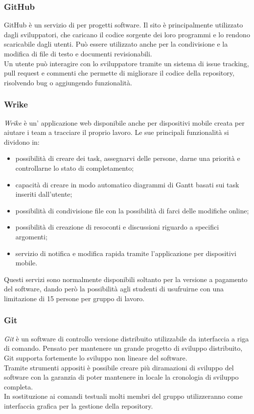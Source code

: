 \documentclass[../NormediProgetto.tex]{subfiles}
\begin{document}
	\subsubsection{GitHub}
	
	GitHub è un servizio di  per progetti software. 
	Il sito è principalmente utilizzato dagli sviluppatori, che caricano il codice sorgente dei loro programmi e lo rendono scaricabile dagli utenti. Può essere utilizzato anche per la condivisione e la modifica di file di testo e documenti revisionabili.
	\\ \noindent Un utente può interagire con lo sviluppatore tramite un sistema di issue tracking, pull request e commenti che permette di migliorare il codice della repository, risolvendo bug o aggiungendo funzionalità.

	\subsubsection{Wrike}

	\textit{Wrike} è un' applicazione web disponibile anche per dispositivi mobile creata per aiutare i team a tracciare il proprio lavoro. Le sue principali funzionalità si dividono in:
	\begin{itemize}
		\item possibilità di creare dei task, assegnarvi delle persone, darne una priorità e controllarne lo stato di completamento;
		\item capacità di creare in modo automatico diagrammi di Gantt basati sui task inseriti dall'utente;
		\item possibilità di condivisione file con la possibilità di farci delle modifiche online;
		\item possibilità di creazione di resoconti e discussioni riguardo a specifici argomenti;
		\item servizio di notifica e modifica rapida tramite l'applicazione per dispositivi mobile.
	\end{itemize}
	Questi servizi sono normalmente disponibili soltanto per la versione a pagamento del software, dando però la possibilità agli studenti di usufruirne con una limitazione di 15 persone per gruppo di lavoro.

	\subsubsection{Git}

	\textit{Git} è un software di controllo versione distribuito utilizzabile da interfaccia a riga di comando. Pensato per mantenere un grande progetto di sviluppo distribuito, Git supporta fortemente lo sviluppo non lineare del software.
	\\ \noindent Tramite strumenti appositi è possibile creare più diramazioni di sviluppo del software con la garanzia di poter mantenere in locale la cronologia di sviluppo completa.
	\\ \noindent In sostituzione ai comandi testuali molti membri del gruppo utilizzeranno  come interfaccia grafica per la gestione della repository.
	
\end{document}
